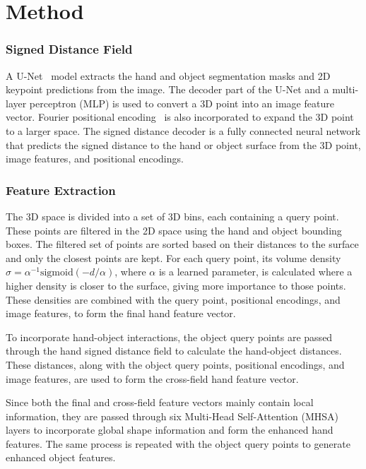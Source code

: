 \documentclass{article}
\begin{document}
\section*{Method}

\subsubsection*{Signed Distance Field}

A U-Net~\cite{ronneberger2015unet} model extracts the hand and object segmentation masks and 2D keypoint predictions from the image. The decoder part of the U-Net and a multi-layer perceptron (MLP) is used to convert a 3D point into an image feature vector. Fourier positional encoding~\cite{tancik2020fourier} is also incorporated to expand the 3D point to a larger space. The signed distance decoder is a fully connected neural network that predicts the signed distance to the hand or object surface from the 3D point, image features, and positional encodings.

\subsubsection*{Feature Extraction}

The 3D space is divided into a set of 3D bins, each containing a query point. These points are filtered in the 2D space using the hand and object bounding boxes. The filtered set of points are sorted based on their distances to the surface and only the closest points are kept. For each query point, its volume density $\sigma = \alpha^{-1}\text{sigmoid}(-d/\alpha)$, where $\alpha$ is a learned parameter, is calculated where a higher density is closer to the surface, giving more importance to those points. These densities are combined with the query point, positional encodings, and image features, to form the final hand feature vector.

To incorporate hand-object interactions, the object query points are passed through the hand signed distance field to calculate the hand-object distances. These distances, along with the object query points, positional encodings, and image features, are used to form the cross-field hand feature vector.

Since both the final and cross-field feature vectors mainly contain local information, they are passed through six Multi-Head Self-Attention (MHSA)~\cite{vaswani2017attention} layers to incorporate global shape information and form the enhanced hand features. The same process is repeated with the object query points to generate enhanced object features.
\end{document}

